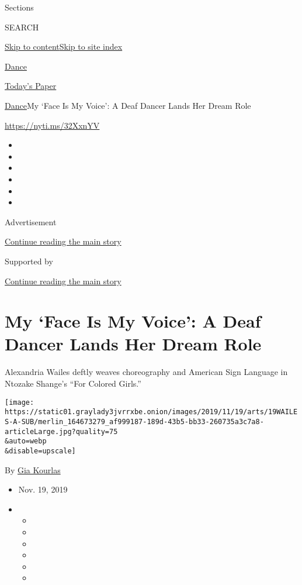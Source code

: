 Sections

SEARCH

\protect\hyperlink{site-content}{Skip to
content}\protect\hyperlink{site-index}{Skip to site index}

\href{https://www.nytimes3xbfgragh.onion/section/arts/dance}{Dance}

\href{https://myaccount.nytimes3xbfgragh.onion/auth/login?response_type=cookie\&client_id=vi}{}

\href{https://www.nytimes3xbfgragh.onion/section/todayspaper}{Today's
Paper}

\href{/section/arts/dance}{Dance}\textbar{}My `Face Is My Voice': A Deaf
Dancer Lands Her Dream Role

\url{https://nyti.ms/32XxnYV}

\begin{itemize}
\item
\item
\item
\item
\item
\item
\end{itemize}

Advertisement

\protect\hyperlink{after-top}{Continue reading the main story}

Supported by

\protect\hyperlink{after-sponsor}{Continue reading the main story}

\hypertarget{my-face-is-my-voice-a-deaf-dancer-lands-her-dream-role}{%
\section{My `Face Is My Voice': A Deaf Dancer Lands Her Dream
Role}\label{my-face-is-my-voice-a-deaf-dancer-lands-her-dream-role}}

Alexandria Wailes deftly weaves choreography and American Sign Language
in Ntozake Shange's ``For Colored Girls.''

\texttt{[image: https://static01.graylady3jvrrxbe.onion/images/2019/11/19/arts/19WAILES-A-SUB/merlin\_164673279\_af999187-189d-43b5-bb33-260735a3c7a8-articleLarge.jpg?quality=75\\\&auto=webp\\\&disable=upscale]}

By \href{https://www.nytimes3xbfgragh.onion/by/gia-kourlas}{Gia Kourlas}

\begin{itemize}
\item
  Nov. 19, 2019
\item
  \begin{itemize}
  \item
  \item
  \item
  \item
  \item
  \item
  \end{itemize}
\end{itemize}

